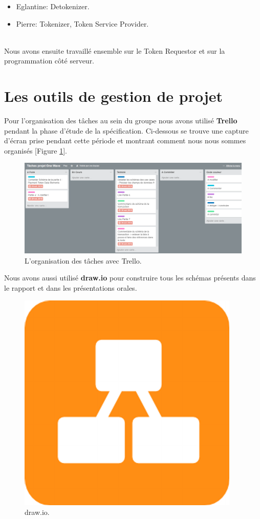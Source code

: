 \documentclass{report}
\begin{document}
\begin{itemize}
	\item Eglantine: Detokenizer.
	\item Pierre: Tokenizer, Token Service Provider.
\end{itemize}

~\\
\noindent
Nous avons ensuite travaillé ensemble sur le Token Requestor et sur la programmation côté serveur.

\section{Les outils de gestion de projet}
Pour l'organisation des tâches au sein du groupe nous avons utilisé \textbf{Trello} pendant la phase d'étude de la spécification. Ci-dessous se trouve une capture d'écran prise pendant cette période et montrant comment nous nous sommes organisés [Figure \ref{Trello}]. 

\begin{figure}[!ht]
    \centering
			\includegraphics[scale=0.46]{img/trello.PNG}
			\caption{\label{Trello} L'organisation des tâches avec Trello.}			
\end{figure}

\newpage
\noindent
Nous avons aussi utilisé \textbf{draw.io} pour construire tous les schémas présents dans le rapport et dans les présentations orales.

\begin{figure}[!ht]
    \centering
			\includegraphics[scale=0.2]{img/draw.png}
			\caption{\label{Draw} draw.io.}			
\end{figure}
\end{document}
